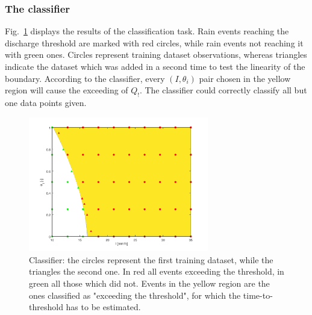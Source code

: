 \subsubsection{The classifier}\label{sec:classifier}

Fig.~\ref{fig:classifier} displays the results of the classification task.
Rain events reaching the discharge threshold are marked with red circles, while rain events not reaching it with green ones. Circles represent training dataset observations, whereas triangles indicate the dataset which was added in a second time to test the linearity of the boundary.
According to the classifier, every $(I, \theta_i)$ pair chosen in the yellow region will cause the exceeding of $Q_!$. The classifier could correctly classify all but one data points given.

\begin{figure}[h]
  \centering
  \includegraphics[width=0.7\textwidth]{Figures/classifier.png}
  \caption{Classifier: the circles represent the first training dataset, while the triangles the second one. In red all events exceeding the threshold, in green all those which did not. Events in the yellow region are the ones classified as "exceeding the threshold", for which the time-to-threshold has to be estimated.}
  \label{fig:classifier}
\end{figure}


